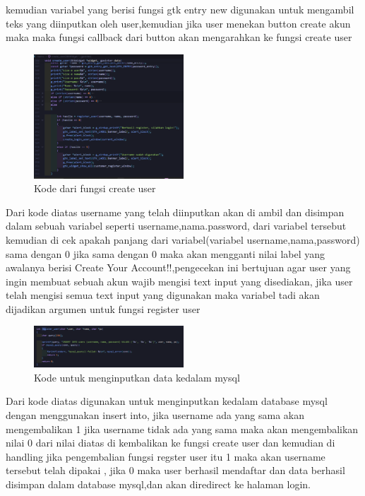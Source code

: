 \documentclass[a4paper,12pt]{article}
\begin{document}
kemudian variabel yang berisi fungsi gtk entry new digunakan untuk mengambil teks yang diinputkan oleh user,kemudian jika user menekan button create akun maka
maka fungsi callback dari button akan mengarahkan ke fungsi create user
\begin{figure}[!htbp]
    \centering
    \includegraphics[width=0.5\textwidth]{./img/kode_fungsi_createuser.png}
    \caption{Kode dari fungsi create user}
\end{figure}
\FloatBarrier
Dari kode diatas username yang telah diinputkan akan di ambil dan disimpan dalam sebuah variabel seperti username,nama.password, dari variabel tersebut kemudian di cek apakah
panjang dari variabel(variabel username,nama,password) sama dengan 0 jika sama dengan 0 maka akan mengganti nilai label yang awalanya berisi
Create Your Account!!,pengecekan ini bertujuan agar user yang ingin membuat sebuah akun wajib mengisi text input yang disediakan, jika user telah mengisi
semua text input yang digunakan maka variabel tadi akan dijadikan argumen untuk fungsi register user
\begin{figure}[!htbp]
    \centering
    \includegraphics[width=0.5\textwidth]{./img/register_user.png}
    \caption{Kode untuk menginputkan data kedalam mysql}
\end{figure}
\FloatBarrier
Dari kode diatas digunakan untuk menginputkan kedalam database mysql dengan menggunakan insert into, jika username ada yang sama akan mengembalikan 1 jika username tidak ada yang sama maka akan mengembalikan 
nilai 0 dari nilai diatas di kembalikan ke fungsi create user dan kemudian di handling jika pengembalian fungsi regster user itu 1 maka akan username tersebut telah dipakai , jika 0 maka user berhasil mendaftar dan data berhasil 
disimpan dalam database mysql,dan akan diredirect ke halaman login.
\end{document}
